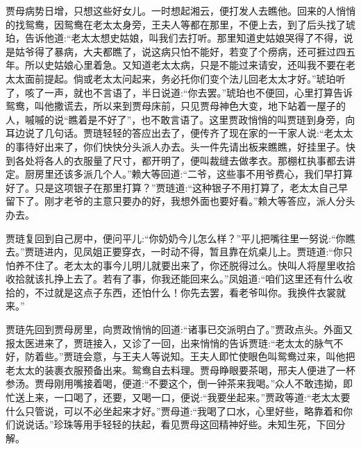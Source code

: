 \begin{parag}
    贾母病势日增，只想这些好女儿。一时想起湘云，便打发人去瞧他。回来的人悄悄的找鸳鸯，因鸳鸯在老太太身旁，王夫人等都在那里，不便上去，到了后头找了琥珀，告诉他道:“老太太想史姑娘，叫我们去打听。那里知道史姑娘哭得了不得，说是姑爷得了暴病，大夫都瞧了，说这病只怕不能好，若变了个痨病，还可捱过四五年。所以史姑娘心里着急。又知道老太太病，只是不能过来请安，还叫我不要在老太太面前提起。倘或老太太问起来，务必托你们变个法儿回老太太才好。”琥珀听了，咳了一声，就也不言语了，半日说道:“你去罢。”琥珀也不便回，心里打算告诉鸳鸯，叫他撒谎去，所以来到贾母床前，只见贾母神色大变，地下站着一屋子的人，嘁嘁的说“瞧着是不好了”，也不敢言语了。这里贾政悄悄的叫贾琏到身旁，向耳边说了几句话。贾琏轻轻的答应出去了，便传齐了现在家的一干家人说:“老太太的事待好出来了，你们快快分头派人办去。头一件先请出板来瞧瞧，好挂里子。快到各处将各人的衣服量了尺寸，都开明了，便叫裁缝去做孝衣。那棚杠执事都去讲定。厨房里还该多派几个人。”赖大等回道:“二爷，这些事不用爷费心，我们早打算好了。只是这项银子在那里打算？”贾琏道:“这种银子不用打算了，老太太自己早留下了。刚才老爷的主意只要办的好，我想外面也要好看。”赖大等答应，派人分头办去。
\end{parag}


\begin{parag}
    贾琏复回到自己房中，便问平儿:“你奶奶今儿怎么样？”平儿把嘴往里一努说:“你瞧去。”贾琏进内，见凤姐正要穿衣，一时动不得，暂且靠在炕桌儿上。贾琏道:“你只怕养不住了。老太太的事今儿明儿就要出来了，你还脱得过么。快叫人将屋里收拾收拾就该扎挣上去了。若有了事，你我还能回来么。”凤姐道:“咱们这里还有什么收拾的，不过就是这点子东西，还怕什么！你先去罢，看老爷叫你。我换件衣裳就来。”
\end{parag}


\begin{parag}
    贾琏先回到贾母房里，向贾政悄悄的回道:“诸事已交派明白了。”贾政点头。外面又报太医进来了，贾琏接入，又诊了一回，出来悄悄的告诉贾琏:“老太太的脉气不好，防着些。”贾琏会意，与王夫人等说知。王夫人即忙使眼色叫鸳鸯过来，叫他把老太太的装裹衣服预备出来。鸳鸯自去料理。贾母睁眼要茶喝，邢夫人便进了一杯参汤。贾母刚用嘴接着喝，便道:“不要这个，倒一钟茶来我喝。”众人不敢违拗，即忙送上来，一口喝了，还要，又喝一口，便说:“我要坐起来。”贾政等道:“老太太要什么只管说，可以不必坐起来才好。”贾母道:“我喝了口水，心里好些，略靠着和你们说说话。”珍珠等用手轻轻的扶起，看见贾母这回精神好些。未知生死，下回分解。
\end{parag}
